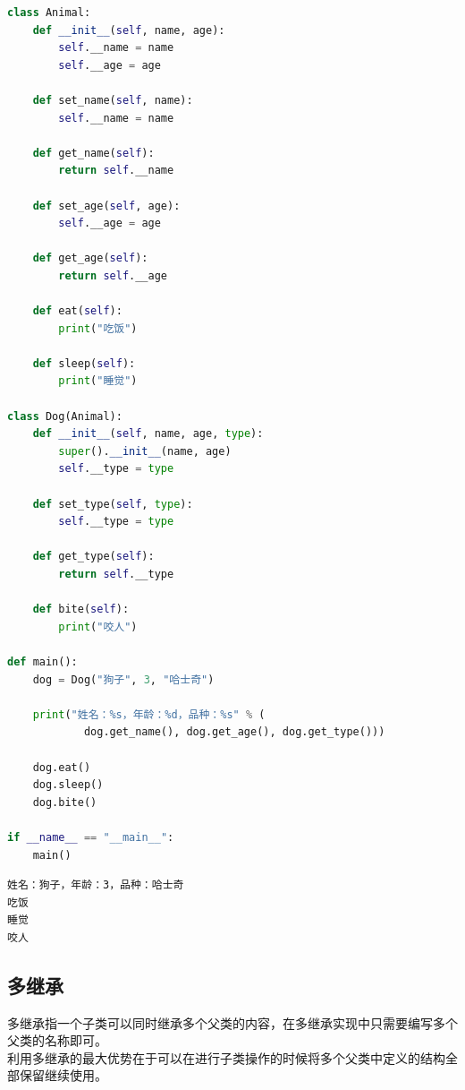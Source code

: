 \begin{lstlisting}[language=Python]
class Animal:
    def __init__(self, name, age):
        self.__name = name
        self.__age = age
    
    def set_name(self, name):
        self.__name = name

    def get_name(self):
        return self.__name
    
    def set_age(self, age):
        self.__age = age

    def get_age(self):
        return self.__age

    def eat(self):
        print("吃饭")
    
    def sleep(self):
        print("睡觉")
    
class Dog(Animal):
    def __init__(self, name, age, type):
        super().__init__(name, age)
        self.__type = type
    
    def set_type(self, type):
        self.__type = type

    def get_type(self):
        return self.__type
    
    def bite(self):
        print("咬人")

def main():
    dog = Dog("狗子", 3, "哈士奇")
    
    print("姓名：%s，年龄：%d，品种：%s" % (
            dog.get_name(), dog.get_age(), dog.get_type()))

    dog.eat()
    dog.sleep()
    dog.bite()

if __name__ == "__main__":
    main()
\end{lstlisting}

\begin{tcolorbox}
	\begin{verbatim}
姓名：狗子，年龄：3，品种：哈士奇
吃饭
睡觉
咬人
\end{verbatim}
\end{tcolorbox}

\vspace{0.5cm}

\subsection{多继承}

多继承指一个子类可以同时继承多个父类的内容，在多继承实现中只需要编写多个父类的名称即可。\\

利用多继承的最大优势在于可以在进行子类操作的时候将多个父类中定义的结构全部保留继续使用。\\

